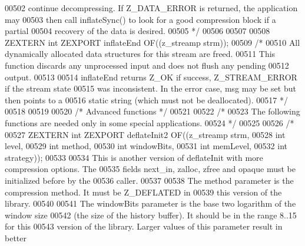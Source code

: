 \begin{DoxyCode}
00502 \textcolor{comment}{  continue decompressing.  If Z\_DATA\_ERROR is returned, the application may}
00503 \textcolor{comment}{  then call inflateSync() to look for a good compression block if a partial}
00504 \textcolor{comment}{  recovery of the data is desired.}
00505 \textcolor{comment}{*/}
00506 
00507 
00508 ZEXTERN \textcolor{keywordtype}{int} ZEXPORT inflateEnd OF((z\_streamp strm));
00509 \textcolor{comment}{/*}
00510 \textcolor{comment}{     All dynamically allocated data structures for this stream are freed.}
00511 \textcolor{comment}{   This function discards any unprocessed input and does not flush any pending}
00512 \textcolor{comment}{   output.}
00513 \textcolor{comment}{}
00514 \textcolor{comment}{     inflateEnd returns Z\_OK if success, Z\_STREAM\_ERROR if the stream state}
00515 \textcolor{comment}{   was inconsistent.  In the error case, msg may be set but then points to a}
00516 \textcolor{comment}{   static string (which must not be deallocated).}
00517 \textcolor{comment}{*/}
00518 
00519 
00520                         \textcolor{comment}{/* Advanced functions */}
00521 
00522 \textcolor{comment}{/*}
00523 \textcolor{comment}{    The following functions are needed only in some special applications.}
00524 \textcolor{comment}{*/}
00525 
00526 \textcolor{comment}{/*}
00527 \textcolor{comment}{ZEXTERN int ZEXPORT deflateInit2 OF((z\_streamp strm,}
00528 \textcolor{comment}{                                     int  level,}
00529 \textcolor{comment}{                                     int  method,}
00530 \textcolor{comment}{                                     int  windowBits,}
00531 \textcolor{comment}{                                     int  memLevel,}
00532 \textcolor{comment}{                                     int  strategy));}
00533 \textcolor{comment}{}
00534 \textcolor{comment}{     This is another version of deflateInit with more compression options.  The}
00535 \textcolor{comment}{   fields next\_in, zalloc, zfree and opaque must be initialized before by the}
00536 \textcolor{comment}{   caller.}
00537 \textcolor{comment}{}
00538 \textcolor{comment}{     The method parameter is the compression method.  It must be Z\_DEFLATED in}
00539 \textcolor{comment}{   this version of the library.}
00540 \textcolor{comment}{}
00541 \textcolor{comment}{     The windowBits parameter is the base two logarithm of the window size}
00542 \textcolor{comment}{   (the size of the history buffer).  It should be in the range 8..15 for this}
00543 \textcolor{comment}{   version of the library.  Larger values of this parameter result in better}

\end{DoxyCode}
